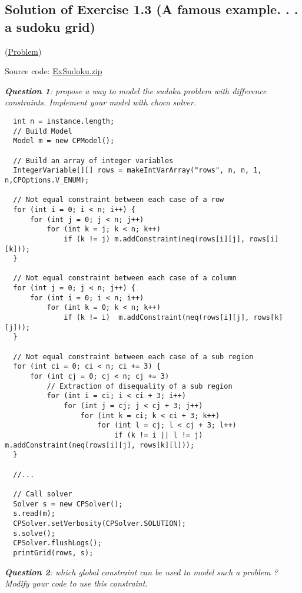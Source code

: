 \subsection{Solution of Exercise 1.3 (A famous example. . . a sudoku grid)}\label{solutions:solutionofexercise1.3}\hypertarget{solutions:solutionofexercise1.3}{}

(\hyperlink{exercises:exercise1.3}{Problem})

Source code: \href{media/zip/exsudoku.zip}{ExSudoku.zip}

\noindent\emph{\textbf{Question 1}: propose a way to model the sudoku problem with difference constraints. Implement your model with choco solver.}

\begin{lstlisting}
  int n = instance.length;
  // Build Model
  Model m = new CPModel();
  
  // Build an array of integer variables
  IntegerVariable[][] rows = makeIntVarArray("rows", n, n, 1, n,CPOptions.V_ENUM);
	
  // Not equal constraint between each case of a row
  for (int i = 0; i < n; i++) {
      for (int j = 0; j < n; j++)
          for (int k = j; k < n; k++)
              if (k != j) m.addConstraint(neq(rows[i][j], rows[i][k]));
  }
                  
  // Not equal constraint between each case of a column
  for (int j = 0; j < n; j++) {
      for (int i = 0; i < n; i++)
          for (int k = 0; k < n; k++)
              if (k != i)  m.addConstraint(neq(rows[i][j], rows[k][j]));
  }

  // Not equal constraint between each case of a sub region
  for (int ci = 0; ci < n; ci += 3) {
      for (int cj = 0; cj < n; cj += 3)
          // Extraction of disequality of a sub region
          for (int i = ci; i < ci + 3; i++)
              for (int j = cj; j < cj + 3; j++)
                  for (int k = ci; k < ci + 3; k++)
                      for (int l = cj; l < cj + 3; l++)
                          if (k != i || l != j) m.addConstraint(neq(rows[i][j], rows[k][l]));
  }
	
  //...
	
  // Call solver
  Solver s = new CPSolver();
  s.read(m);
  CPSolver.setVerbosity(CPSolver.SOLUTION);
  s.solve();
  CPSolver.flushLogs();
  printGrid(rows, s);
\end{lstlisting}

\noindent\emph{\textbf{Question 2}: which global constraint can be used to model such a problem ? Modify your code to use this constraint.}

